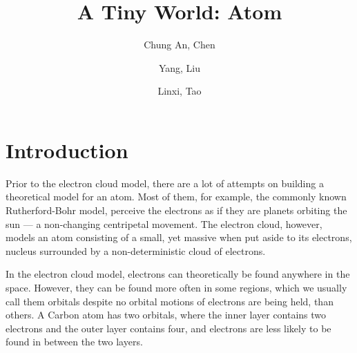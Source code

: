\documentclass[acmtog]{acmart}
\begin{document}
\title{A Tiny World: Atom}

\author{Chung An, Chen}
\author{Yang, Liu}
\author{Linxi, Tao}

\renewcommand{\shortauthors}{Trovato and Tobin, et al.}




\maketitle

\section{Introduction}
Prior to the electron cloud model, there are a lot of attempts on building a theoretical model for an atom. Most of them, for example, the commonly known Rutherford-Bohr model, perceive the electrons as if they are planets orbiting the sun --- a non-changing centripetal movement. The electron cloud, however, models an atom consisting of a small, yet massive when put aside to its electrons, nucleus surrounded by a non-deterministic cloud of electrons.

In the electron cloud model, electrons can theoretically be found anywhere in the space. However, they can be found more often in some regions, which we usually call them orbitals despite no orbital motions of electrons are being held, than others. A Carbon atom has two orbitals, where the inner layer contains two electrons and the outer layer contains four, and electrons are less likely to be found in between the two layers.
\end{document}
